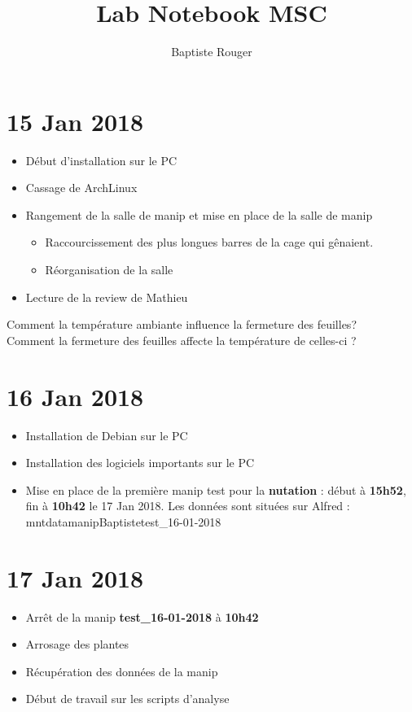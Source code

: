 \documentclass[10pt,a4paper]{article}
\author{Baptiste Rouger}
\title{Lab Notebook MSC}
\begin{document}
\maketitle

\tableofcontents

\newpage

\section{15 Jan 2018}

\begin{itemize}
\item Début d'installation sur le PC
\item Cassage de ArchLinux
\item Rangement de la salle de manip et mise en place de la salle de manip
	\begin{itemize}
	\item Raccourcissement des plus longues barres de la cage qui gênaient.
	\item Réorganisation de la salle
	\end{itemize}
\item Lecture de la review de Mathieu
\end{itemize}

Comment la température ambiante influence la fermeture des feuilles? \\
Comment la fermeture des feuilles affecte la température de celles-ci ?

\section{16 Jan 2018}
\begin{itemize}
\item Installation de Debian sur le PC
\item Installation des logiciels importants sur le PC
\item Mise en place de la première manip test pour la \textbf{nutation} : début à \textbf{15h52}, fin à \textbf{10h42} le 17 Jan 2018. Les données sont situées sur Alfred : \/mnt\/data\/manip\/Baptiste\/test\_16-01-2018
\end{itemize}

\section{17 Jan 2018}
\begin{itemize}
\item Arrêt de la manip \textbf{test\_16-01-2018} à \textbf{10h42}
\item Arrosage des plantes
\item Récupération des données de la manip
\item Début de travail sur les scripts d'analyse
\end{itemize}
\end{document}
